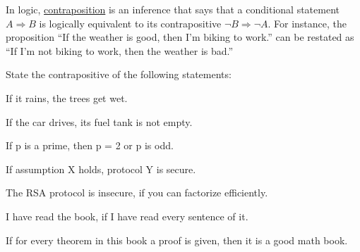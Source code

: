 \documentclass[a4paper,10pt,landscape,twocolumn]{scrartcl}
\begin{document}
\enlargethispage{2cm}
\begin{exercise}
In logic, \href{https://en.wikipedia.org/wiki/Contraposition}{contraposition} is an inference that says that a conditional statement $A \Rightarrow B$ is logically equivalent to its contrapositive $\neg B \Rightarrow \neg A$. For instance, the proposition ``If the weather is good, then I'm biking to work.'' can be restated as ``If I'm not biking to work, then the weather is bad.''

State the contrapositive of the following statements:
\begin{subex}
If it rains, the trees get wet.
\end{subex}
\begin{subex}
If the car drives, its fuel tank is not empty.
\end{subex}
\begin{subex}
If p is a prime, then p = 2 or p is odd.
\end{subex}
\begin{subex}
If assumption X holds, protocol Y is secure.
\end{subex}
\begin{subex}
The RSA protocol is insecure, if you can factorize efficiently.
\end{subex}
\begin{subex}
I have read the book, if I have read every sentence of it.
\end{subex}
\begin{subex}
If for every theorem in this book a proof is given, then it is a
good math book.
\end{subex}
\end{exercise}
\end{document}
